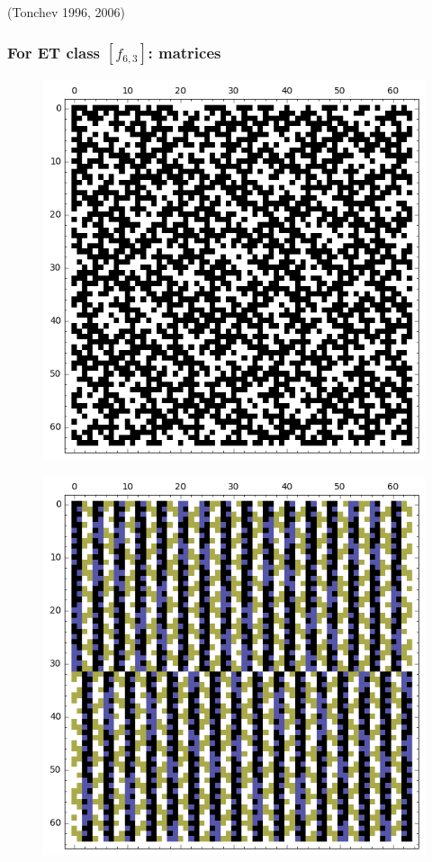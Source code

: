 \documentclass[pdf,sprung,slideColor,nocolorBG]{beamer}
\newenvironment{colortheme}[1]{
\def\ProvidesPackageRCS $##1${\relax}
\renewcommand{\ProcessOptions}{\relax}
\makeatletter

\makeatother
}{}
\newcommand{\slidecite}[1]{\tiny{(#1)}\normalsize{}}
\begin{document}
\begin{colortheme}{jubata}
\begin{frame}
\slidecite{Tonchev 1996, 2006}
\end{frame}
\begin{frame}
\frametitle{For ET class $[f_{6,3}]$: matrices}
\begin{figure}
\centering
\begin{minipage}{.48\textwidth}
  \centering
  \includegraphics[width=.9\linewidth]{../matrix_plot/re6_3_weight_class_matrix.png}
  \label{fig:6_3_weight_class_matrix}
\end{minipage}%
\begin{minipage}{.48\textwidth}
  \centering
  \includegraphics[width=.9\linewidth]{../matrix_plot/re6_3_bent_cayley_graph_index_matrix.png}

\end{minipage}
\end{figure}
\end{frame}
\end{colortheme}
\end{document}
